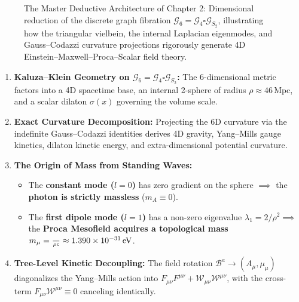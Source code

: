 \documentclass[
    12pt,
    a4paper,
    headings=normal,
    twoside=false,
    open=any,
    parskip=half
]{scrbook}
\let\hbar\relax
\begin{document}
\begin{figure}[htbp]
\caption{The Master Deductive Architecture of Chapter 2: Dimensional reduction of the discrete graph fibration $\mathcal{G}_6 = \mathcal{G}_4 \square \mathcal{G}_{S_2}$, illustrating how the triangular vielbein, the internal Laplacian eigenmodes, and Gauss--Codazzi curvature projections rigorously generate 4D Einstein--Maxwell--Proca--Scalar field theory.}
\label{fig:ch2_master_deductive_architecture_flow}
\end{figure}

\begin{tcolorbox}[colback=maincolor!3!white, colframe=maincolor!80!black, title={\textbf{Grand Synthesis of Chapter 2}}]
\begin{enumerate}[leftmargin=1.5em, itemsep=5pt]
    \item \textbf{Kaluza--Klein Geometry on $\mathcal{G}_6 = \mathcal{G}_4 \square \mathcal{G}_{S_2}$:} The 6-dimensional metric factors into a 4D spacetime base, an internal 2-sphere of radius $\rho \approx 46\,\text{Mpc}$, and a scalar dilaton $\sigma(x)$ governing the volume scale.
    \item \textbf{Exact Curvature Decomposition:} Projecting the 6D curvature via the indefinite Gauss--Codazzi identities derives 4D gravity, Yang--Mills gauge kinetics, dilaton kinetic energy, and extra-dimensional potential curvature.
    \item \textbf{The Origin of Mass from Standing Waves:}
    \begin{itemize}[noitemsep]
        \item The \textbf{constant mode ($l=0$)} has zero gradient on the sphere $\implies$ the \textbf{photon is strictly massless} ($m_A \equiv 0$).
        \item The \textbf{first dipole mode ($l=1$)} has a non-zero eigenvalue $\lambda_1 = 2/\rho^2 \implies$ the \textbf{Proca Mesofield acquires a topological mass} $m_\mu = \frac{\hbar}{\rho c} \approx 1.390 \times 10^{-31}\,\text{eV}$.
    \end{itemize}
    \item \textbf{Tree-Level Kinetic Decoupling:} The field rotation $\mathcal{B}^a \to (A_\mu, \mu_\mu)$ diagonalizes the Yang--Mills action into $F_{\mu\nu}F^{\mu\nu} + \mathcal{W}_{\mu\nu}\mathcal{W}^{\mu\nu}$, with the cross-term $F_{\mu\nu}\mathcal{W}^{\mu\nu} \equiv 0$ canceling identically.

\end{enumerate}
\end{tcolorbox}
\end{document}
